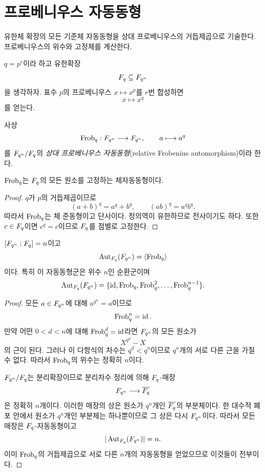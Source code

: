 \clearpage
\section{프로베니우스 자동동형}
\label{sec:finite-field-frobenius}

\begin{learninggoal}
유한체 확장의 모든 기준체 자동동형을 상대 프로베니우스의 거듭제곱으로 기술한다. 프로베니우스의 위수와 고정체를 계산한다.
\end{learninggoal}

$q=p^r$이라 하고 유한확장
\[
  F_q\subseteq F_{q^n}
\]
을 생각하자. 표수 $p$의 프로베니우스 $x\mapsto x^p$를 $r$번 합성하면
\[
  x\longmapsto x^q
\]
를 얻는다.

\begin{definition}[상대 프로베니우스]
사상
\[
  \operatorname{Frob}_q:F_{q^n}\longrightarrow F_{q^n},
  \qquad
  a\longmapsto a^q
\]
를 $F_{q^n}/F_q$의 \emph{상대 프로베니우스 자동동형}(relative Frobenius automorphism)이라 한다.
\end{definition}

\begin{proposition}
$\operatorname{Frob}_q$는 $F_q$의 모든 원소를 고정하는 체자동동형이다.
\end{proposition}

\begin{proof}
$q$가 $p$의 거듭제곱이므로
\[
  (a+b)^q=a^q+b^q,
  \qquad
  (ab)^q=a^qb^q.
\]
따라서 $\operatorname{Frob}_q$는 체 준동형이고 단사이다. 정의역이 유한하므로 전사이기도 하다. 또한 $c\in F_q$이면 $c^q=c$이므로 $F_q$를 점별로 고정한다.
\end{proof}

\begin{theorem}
$[F_{q^n}:F_q]=n$이고
\[
  \operatorname{Aut}_{F_q}(F_{q^n})
  =\langle\operatorname{Frob}_q\rangle
\]
이다. 특히 이 자동동형군은 위수 $n$인 순환군이며
\[
  \operatorname{Aut}_{F_q}(F_{q^n})
  =\{\operatorname{id},\operatorname{Frob}_q,\operatorname{Frob}_q^2,\dots,\operatorname{Frob}_q^{n-1}\}.
\]
\end{theorem}

\begin{proof}
모든 $a\in F_{q^n}$에 대해 $a^{q^n}=a$이므로
\[
  \operatorname{Frob}_q^n=\operatorname{id}.
\]
만약 어떤 $0<d<n$에 대해 $\operatorname{Frob}_q^d=\operatorname{id}$라면 $F_{q^n}$의 모든 원소가
\[
  X^{q^d}-X
\]
의 근이 된다. 그러나 이 다항식의 차수는 $q^d<q^n$이므로 $q^n$개의 서로 다른 근을 가질 수 없다. 따라서 $\operatorname{Frob}_q$의 위수는 정확히 $n$이다.

$F_{q^n}/F_q$는 분리확장이므로 분리차수 정리에 의해 $F_q$-매장
\[
  F_{q^n}\longrightarrow\overline{F_q}
\]
은 정확히 $n$개이다. 이러한 매장의 상은 원소가 $q^n$개인 $\overline{F_q}$의 부분체이다. 한 대수적 폐포 안에서 원소가 $q^n$개인 부분체는 하나뿐이므로 그 상은 다시 $F_{q^n}$이다. 따라서 모든 매장은 $F_q$-자동동형이고
\[
  |\operatorname{Aut}_{F_q}(F_{q^n})|=n.
\]
이미 $\operatorname{Frob}_q$의 거듭제곱으로 서로 다른 $n$개의 자동동형을 얻었으므로 이것들이 전부이다.
\end{proof}

